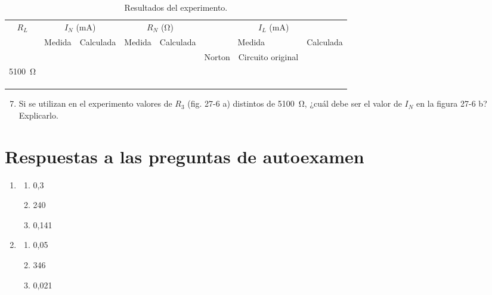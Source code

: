 
\begin{table}[h!]
    \centering
    \caption{Resultados del experimento.}
    \label{tab:27-1}
    \begin{tabular}{|c|c|c|c|c|c|c|c|}
        \hline
        \multirow{3}{*}{$R_L$} & \multicolumn{2}{c|}{$I_N$ (\si{\milli\ampere})} & \multicolumn{2}{c|}{$R_N$ (\si{\ohm})} & \multicolumn{3}{c|}{$I_L$ (\si{\milli\ampere})} \\
        \cline{2-8}
        & \multirow{2}{*}{Medida} & \multirow{2}{*}{Calculada} & \multirow{2}{*}{Medida} & \multirow{2}{*}{Calculada} & \multicolumn{2}{c|}{Medida} & \multirow{2}{*}{Calculada} \\
        \cline{6-7}
        & & & & & Norton & Circuito original & \\
        \hline
        \SI{5100}{\ohm} & & & & & & & \\
        \hline
         & & & & & & & \\
        \hline
         & & & & & & & \\
        \hline
         & & & & & & & \\
        \hline
    \end{tabular}
\end{table}

\vspace{2em}

\begin{enumerate}[label=\arabic*., resume]
    \setcounter{enumi}{6} %
    \item Si se utilizan en el experimento valores de $R_3$ (fig. 27-6 a) distintos de \SI{5100}{\ohm}, ¿cuál debe ser el valor de $I_N$ en la figura 27-6 b? Explicarlo.
\end{enumerate}

\vspace{1cm}

\section{Respuestas a las preguntas de autoexamen}
\begin{enumerate}[label=\arabic*.]
    \item 
    \begin{enumerate}[label=\alph*)]
        \item 0,3
        \item 240
        \item 0,141
    \end{enumerate}
    \item 
    \begin{enumerate}[label=\alph*)]
        \item 0,05
        \item 346
        \item 0,021
    \end{enumerate}
\end{enumerate}